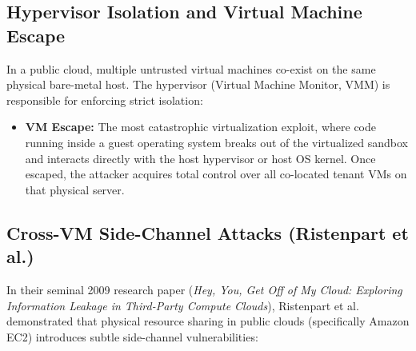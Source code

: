\documentclass[11pt,a4paper,openany]{report}
\begin{document}
\subsection{Hypervisor Isolation and Virtual Machine Escape}
In a public cloud, multiple untrusted virtual machines co-exist on the same physical bare-metal host. The hypervisor (Virtual Machine Monitor, VMM) is responsible for enforcing strict isolation:
\begin{itemize}[leftmargin=*]
  \item \textbf{VM Escape:} The most catastrophic virtualization exploit, where code running inside a guest operating system breaks out of the virtualized sandbox and interacts directly with the host hypervisor or host OS kernel. Once escaped, the attacker acquires total control over all co-located tenant VMs on that physical server.
\end{itemize}

\subsection{Cross-VM Side-Channel Attacks (Ristenpart et al.)}
In their seminal 2009 research paper (\emph{Hey, You, Get Off of My Cloud: Exploring Information Leakage in Third-Party Compute Clouds}), Ristenpart et al. demonstrated that physical resource sharing in public clouds (specifically Amazon EC2) introduces subtle side-channel vulnerabilities:
\end{document}
